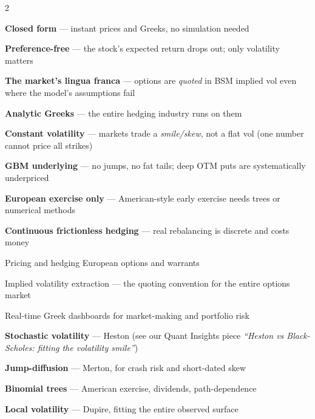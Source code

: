 \documentclass{pyportfolios-note}
\begin{document}
\begin{multicols}{2}
\begin{notebullets}
\item \textbf{Closed form} — instant prices and Greeks, no simulation needed
\item \textbf{Preference-free} — the stock's expected return drops out; only
      volatility matters
\item \textbf{The market's lingua franca} — options are \textit{quoted} in BSM
      implied vol even where the model's assumptions fail
\item \textbf{Analytic Greeks} — the entire hedging industry runs on them
\end{notebullets}

\begin{notebullets}
\item \textbf{Constant volatility} — markets trade a \textit{smile/skew}, not a
      flat vol (one number cannot price all strikes)
\item \textbf{GBM underlying} — no jumps, no fat tails; deep OTM puts are
      systematically underpriced
\item \textbf{European exercise only} — American-style early exercise needs
      trees or numerical methods
\item \textbf{Continuous frictionless hedging} — real rebalancing is discrete
      and costs money
\end{notebullets}

\begin{notebullets}
\item Pricing and hedging European options and warrants
\item Implied volatility extraction — the quoting convention for the entire
      options market
\item Real-time Greek dashboards for market-making and portfolio risk
\end{notebullets}

\begin{notebullets}
\item \textbf{Stochastic volatility} — Heston (see our Quant Insights piece
      \textit{``Heston vs Black-Scholes: fitting the volatility smile''})
\item \textbf{Jump-diffusion} — Merton, for crash risk and short-dated skew
\item \textbf{Binomial trees} — American exercise, dividends, path-dependence
\item \textbf{Local volatility} — Dupire, fitting the entire observed surface
\end{notebullets}
\end{multicols}
\end{document}
